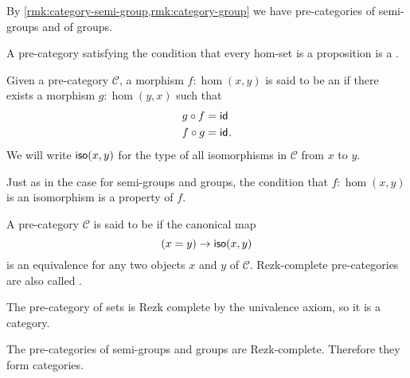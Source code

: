 \begin{eg}
  By \cref{rmk:category-semi-group,rmk:category-group} we have pre-categories of semi-groups and of groups.
\end{eg}

\begin{eg}
  A pre-category satisfying the condition that every hom-set is a proposition is a . 
\end{eg}

\begin{defn}
  Given a pre-category $\mathcal{C}$, a morphism $f:\hom(x,y)$ is said to be an  if there exists a morphism $g:\hom(y,x)$ such that
  \begin{align*}
    g \circ f & = \mathsf{id}_{} \\
    f \circ g & = \mathsf{id}_{}.
  \end{align*}
  We will write $\mathsf{iso}(x,y)$ for the type of all isomorphisms in $\mathcal{C}$ from $x$ to $y$.
\end{defn}

\begin{rmk}
  Just as in the case for semi-groups and groups, the condition that $f:\hom(x,y)$ is an isomorphism is a property of $f$.
\end{rmk}

\begin{defn}
  A pre-category $\mathcal{C}$ is said to be  if the canonical map
  \begin{equation*}
    (x=y)\to \mathsf{iso}(x,y)
  \end{equation*}
  is an equivalence for any two objects $x$ and $y$ of $\mathcal{C}$. Rezk-complete pre-categories are also called .
\end{defn}

\begin{eg}
  The pre-category of sets is Rezk complete by the univalence axiom, so it is a category.
\end{eg}

\begin{eg}
  The pre-categories of semi-groups and groups are Rezk-complete. Therefore they form categories.
\end{eg}

